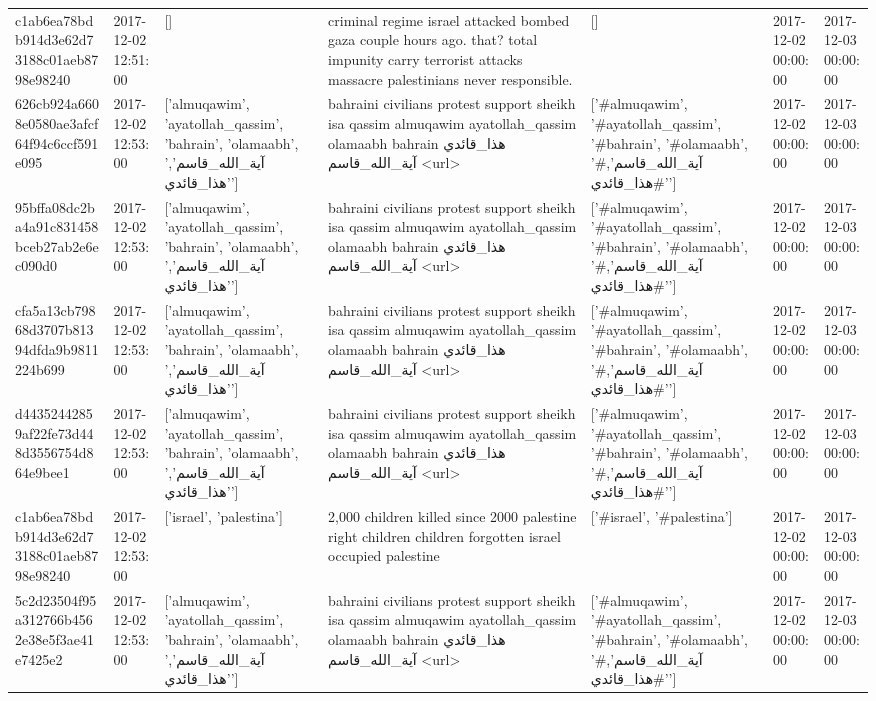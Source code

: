 \begin{tabular}{lllllll}
c1ab6ea78bdb914d3e62d73188c01aeb8798e98240 & 2017-12-02 12:51:00 & [] & criminal regime israel attacked bombed gaza couple hours ago. that? total impunity carry terrorist attacks massacre palestinians never responsible. & [] & 2017-12-02 00:00:00 & 2017-12-03 00:00:00 \\
626cb924a6608e0580ae3afcf64f94c6ccf591e095 & 2017-12-02 12:53:00 & ['almuqawim', 'ayatollah_qassim', 'bahrain', 'olamaabh', 'آية_الله_قاسم', 'هذا_قائدي'] & bahraini civilians protest support sheikh isa qassim almuqawim ayatollah\_qassim olamaabh bahrain هذا\_قائدي آية\_الله\_قاسم <url> & ['#almuqawim', '#ayatollah_qassim', '#bahrain', '#olamaabh', '#آية_الله_قاسم', '#هذا_قائدي'] & 2017-12-02 00:00:00 & 2017-12-03 00:00:00 \\
95bffa08dc2ba4a91c831458bceb27ab2e6ec090d0 & 2017-12-02 12:53:00 & ['almuqawim', 'ayatollah_qassim', 'bahrain', 'olamaabh', 'آية_الله_قاسم', 'هذا_قائدي'] & bahraini civilians protest support sheikh isa qassim almuqawim ayatollah\_qassim olamaabh bahrain هذا\_قائدي آية\_الله\_قاسم <url> & ['#almuqawim', '#ayatollah_qassim', '#bahrain', '#olamaabh', '#آية_الله_قاسم', '#هذا_قائدي'] & 2017-12-02 00:00:00 & 2017-12-03 00:00:00 \\
cfa5a13cb79868d3707b81394dfda9b9811224b699 & 2017-12-02 12:53:00 & ['almuqawim', 'ayatollah_qassim', 'bahrain', 'olamaabh', 'آية_الله_قاسم', 'هذا_قائدي'] & bahraini civilians protest support sheikh isa qassim almuqawim ayatollah\_qassim olamaabh bahrain هذا\_قائدي آية\_الله\_قاسم <url> & ['#almuqawim', '#ayatollah_qassim', '#bahrain', '#olamaabh', '#آية_الله_قاسم', '#هذا_قائدي'] & 2017-12-02 00:00:00 & 2017-12-03 00:00:00 \\
d44352442859af22fe73d448d3556754d864e9bee1 & 2017-12-02 12:53:00 & ['almuqawim', 'ayatollah_qassim', 'bahrain', 'olamaabh', 'آية_الله_قاسم', 'هذا_قائدي'] & bahraini civilians protest support sheikh isa qassim almuqawim ayatollah\_qassim olamaabh bahrain هذا\_قائدي آية\_الله\_قاسم <url> & ['#almuqawim', '#ayatollah_qassim', '#bahrain', '#olamaabh', '#آية_الله_قاسم', '#هذا_قائدي'] & 2017-12-02 00:00:00 & 2017-12-03 00:00:00 \\
c1ab6ea78bdb914d3e62d73188c01aeb8798e98240 & 2017-12-02 12:53:00 & ['israel', 'palestina'] & 2,000 children killed since 2000 palestine right children children forgotten israel occupied palestine & ['#israel', '#palestina'] & 2017-12-02 00:00:00 & 2017-12-03 00:00:00 \\
5c2d23504f95a312766b4562e38e5f3ae41e7425e2 & 2017-12-02 12:53:00 & ['almuqawim', 'ayatollah_qassim', 'bahrain', 'olamaabh', 'آية_الله_قاسم', 'هذا_قائدي'] & bahraini civilians protest support sheikh isa qassim almuqawim ayatollah\_qassim olamaabh bahrain هذا\_قائدي آية\_الله\_قاسم <url> & ['#almuqawim', '#ayatollah_qassim', '#bahrain', '#olamaabh', '#آية_الله_قاسم', '#هذا_قائدي'] & 2017-12-02 00:00:00 & 2017-12-03 00:00:00 \\

\end{tabular}
